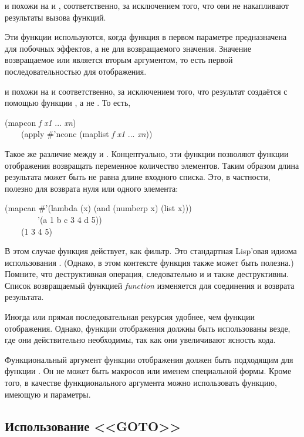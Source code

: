 \begin{defun}[Функция]
 и  похожи на  и , соответственно,
за исключением того, что они не накапливают результаты вызова функций.

Эти функции используются, когда функция в первом параметре предназначена для
побочных эффектов, а не для возвращаемого значения.
Значение возвращаемое  или  является вторым аргументом, то
есть первой последовательностью для отображения.

 и  похожи на  и 
соответственно, за исключением того, что результат создаётся с помощью функции
, а не . То есть, 
\begin{lisp}
(mapcon \emph{f} \emph{x1} ... \emph{xn}) \\
~~~\EQ\ (apply \#'nconc (maplist \emph{f} \emph{x1} ... \emph{xn}))
\end{lisp}
Такое же различие между  и .
Концептуально, эти функции позволяют функции отображения возвращать переменное
количество элементов. Таким образом длина результата может быть не равна длине
входного списка.
Это, в частности, полезно для возврата нуля или одного элемента:
\begin{lisp}
(mapcan \#'(lambda (x) (and (numberp x) (list x))) \\
~~~~~~~~'(a 1 b c 3 4 d 5)) \\
~~~\EV\ (1 3 4 5)
\end{lisp}
В этом случае функция действует, как фильтр. Это стандартная Lisp'овая идиома
использования .
(Однако, в этом контексте функция  также может быть полезна.)
Помните, что  деструктивная операция, следовательно и  и
 также деструктивны. Список возвращаемый функцией \emph{function}
изменяется для соединения и возврата результата.

Иногда  или прямая последовательная рекурсия удобнее, чем функции
отображения. Однако, функции отображения должны быть использованы везде, где они
действительно необходимы, так как они увеличивают ясность кода.

Функциональный аргумент функции отображения должен быть подходящим для функции
. Он не может быть макросов или именем специальной формы.
Кроме того, в качестве функционального аргумента можно использовать функцию,
имеющую  и  параметры.
\end{defun}

\subsection{Использование <<GOTO>>}


